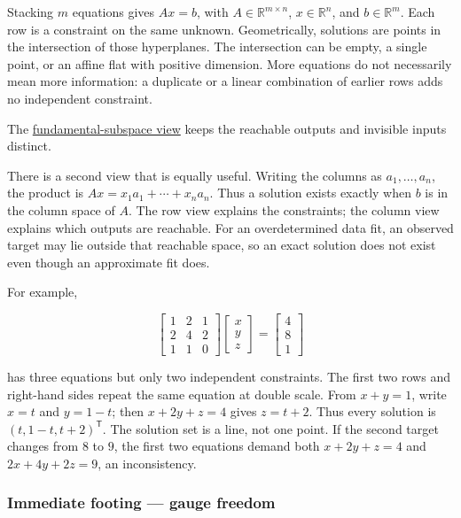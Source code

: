 Stacking \(m\) equations gives \(Ax=b\), with \(A\in\mathbb R^{m\times n}\), \(x\in\mathbb R^n\), and \(b\in\mathbb R^m\). Each row is a constraint on the same unknown. Geometrically, solutions are points in the intersection of those hyperplanes. The intersection can be empty, a single point, or an affine flat with positive dimension. More equations do not necessarily mean more information: a duplicate or a linear combination of earlier rows adds no independent constraint.

The \hyperref[01-foundations-i-ch019-a-system-is-an-intersection-of-constraints]{fundamental-subspace view} keeps the reachable outputs and invisible inputs distinct.

There is a second view that is equally useful. Writing the columns as \(a_1,\ldots,a_n\), the product is \(Ax=x_1a_1+\cdots+x_na_n\). Thus a solution exists exactly when \(b\) is in the column space of \(A\). The row view explains the constraints; the column view explains which outputs are reachable. For an overdetermined data fit, an observed target may lie outside that reachable space, so an exact solution does not exist even though an approximate fit does.

For example,

\[
\begin{bmatrix}1&2&1\\2&4&2\\1&1&0\end{bmatrix}
\begin{bmatrix}x\\y\\z\end{bmatrix}
=\begin{bmatrix}4\\8\\1\end{bmatrix}
\]

has three equations but only two independent constraints. The first two rows and right-hand sides repeat the same equation at double scale. From \(x+y=1\), write \(x=t\) and \(y=1-t\); then \(x+2y+z=4\) gives \(z=t+2\). Thus every solution is \((t,1-t,t+2)^\mathsf T\). The solution set is a line, not one point. If the second target changes from \(8\) to \(9\), the first two equations demand both \(x+2y+z=4\) and \(2x+4y+2z=9\), an inconsistency.

\subsubsection{Immediate footing --- gauge freedom}\label{01-foundations-i-ch019-immediate-footing-gauge-freedom}


